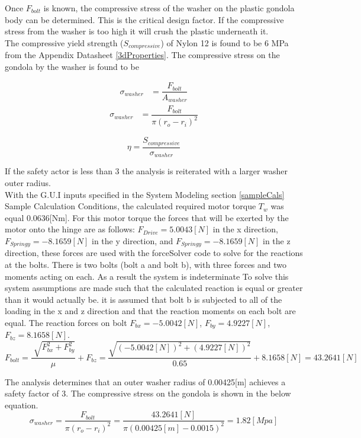 \documentclass[../main.tex]{subfiles}
\begin{document}
Once $F_{bolt}$ is known, the compressive stress of the washer on the plastic gondola body can be determined. This is the critical design factor. If the compressive stress from the washer is too high it will crush the plastic underneath it.\\

The compressive yield strength ($S_{compressive}$) of Nylon 12  is found to be 6 MPa from the Appendix Datasheet \ref{3dProperties}. The compressive stress on the gondola by the washer is found to be 

\begin{align*}
\sigma _{washer} &= \dfrac{F_{bolt}}{A_{washer}}
\end{align*}
\begin{align}
\sigma _{washer} &= \dfrac{F_{bolt}}{\pi (r_o - r_i)^2}
\end{align}

\begin{equation}
\eta = \dfrac{S_{compressive}}{\sigma _{washer}}
\end{equation}

If the safety actor is less than 3 the analysis is reiterated with a larger washer outer radius.\\

With the G.U.I inputs specified in the System Modeling section \ref{sampleCals} Sample Calculation Conditions, the calculated required motor torque $T_w$ was equal 0.0636[Nm]. For this motor torque the forces that will be exerted by the motor onto the hinge are as follows: $F_{Drive} = 5.0043[N]$ in the x direction, $F_{Springy} = -8.1659[N]$ in the y direction, and $F_{Springy} = -8.1659[N]$ in the z direction, these forces are used with the forceSolver code to solve for the reactions at the bolts. There is two bolts (bolt a and bolt b), with three forces and two moments acting on each. As a result the system is indeterminate To solve this system assumptions are made such that the calculated reaction is equal or greater than it would actually be. it is assumed that bolt b is subjected to all of the loading in the x and z direction and that the reaction moments on each bolt are equal. The reaction forces on bolt $F_{bx} = -5.0042[N]$, $F_{by} = 4.9227[N]$, $F_{bz} = 8.1658[N]$. 
\begin{equation*}
F_{bolt} = \dfrac{\sqrt[]{F_{bx}^2 + F_{by}^2}}{\mu} + F_{bz} = \dfrac{\sqrt{(-5.0042[N])^2 + (4.9227[N])^2}}{0.65} + 8.1658[N] = 43.2641[N]
\end{equation*}

The analysis determines that an outer washer radius of 0.00425[m] achieves a safety factor of 3. The compressive stress on the gondola is shown in the below equation. 
\begin{equation*}
\sigma _{washer} = \dfrac{F_{bolt}}{\pi (r_o - r_i)^2} = \dfrac{43.2641[N]}{\pi (0.00425[m] - 0.0015)^2}  = 1.82[Mpa] 
\end{equation*}
\end{document}
